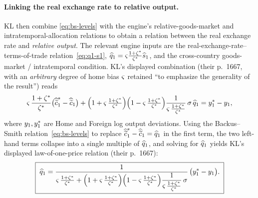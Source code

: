 \paragraph{Linking the real exchange rate to relative output.} KL then combine
\eqref{eq:bs-levels} with the engine's relative-goods-market and
intratemporal-allocation relations to obtain a relation between the real exchange
rate and \emph{relative output}. The relevant engine inputs are the
real-exchange-rate--terms-of-trade relation~\eqref{eq:q1-s1},
$\widehat{q}_1=\varsigma\frac{1+\zeta^{*}}{\zeta^{*}}\widehat{s}_1$, and the cross-country
goods-market / intratemporal condition. KL's displayed combination (their
p.~1667, with an \emph{arbitrary} degree of home bias $\varsigma$ retained ``to
emphasize the generality of the result'') reads
\begin{equation}
\varsigma\,\frac{1+\zeta^{*}}{\zeta^{*}}\bigl(\widehat{\widetilde{c}}^{*}_1-\widehat{\widetilde{c}}_1\bigr)
+\Bigl(1+\varsigma\,\tfrac{1+\zeta^{*}}{\zeta^{*}}\Bigr)
\Bigl(1-\varsigma\,\tfrac{1+\zeta^{*}}{\zeta^{*}}\Bigr)
\frac{1}{\varsigma\,\frac{1+\zeta^{*}}{\zeta^{*}}}\,\sigma\,\widehat{q}_1
= y^{*}_1 - y_1, \label{eq:loop-rel-raw}
\end{equation}
where $y_1,y^{*}_1$ are Home and Foreign log output deviations. Using the
Backus--Smith relation~\eqref{eq:bs-levels} to replace
$\widehat{\widetilde{c}}^{*}_1-\widehat{\widetilde{c}}_1=\widehat{q}_1$ in the first term, the two
left-hand terms collapse into a single multiple of $\widehat{q}_1$, and solving
for $\widehat{q}_1$ yields KL's displayed law-of-one-price relation (their
p.~1667):
\begin{equation}
\boxed{\;
\widehat{q}_1 = \frac{1}
{\varsigma\,\frac{1+\zeta^{*}}{\zeta^{*}}
+\Bigl(1+\varsigma\,\frac{1+\zeta^{*}}{\zeta^{*}}\Bigr)\Bigl(1-\varsigma\,\frac{1+\zeta^{*}}{\zeta^{*}}\Bigr)
\dfrac{1}{\varsigma\,\frac{1+\zeta^{*}}{\zeta^{*}}}\,\sigma}\,
\bigl(y^{*}_1 - y_1\bigr).\;} \label{eq:loop-solved}
\end{equation}

